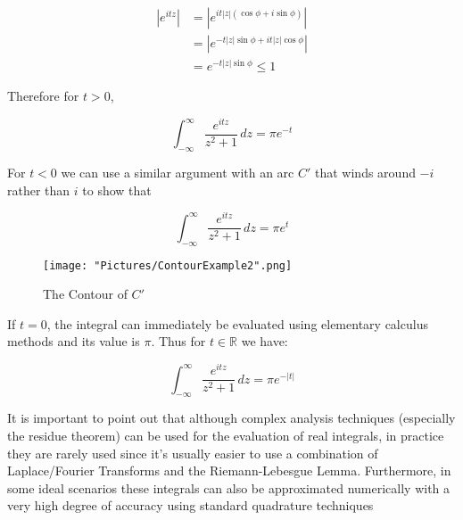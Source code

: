 \documentclass[12pt, letterpaper]{article}
\begin{document}
\begin{align*}
\left|e^{itz}\right| &=\left|e^{it|z|(\cos\phi + i\sin\phi)}\right| \\ &=\left|e^{-t|z|\sin\phi + it|z|\cos\phi}\right| \\
&=e^{-t|z|\sin\phi} \le 1 
\end{align*}

\noindent
Therefore for \(t > 0\),

\[ \int_{-\infty}^\infty \frac{e^{itz}}{z^2+1}\,dz=\pi e^{-t} \]
\bigskip

\noindent
For \(t < 0\) we can use a similar argument with an arc \(C'\) that winds around \(-i\) rather than \(i\) to show that 

\[ \int_{-\infty}^\infty\frac{e^{itz}}{z^2+1}\,dz=\pi e^t \]

\begin{figure}[h]
    \centering
    \texttt{[image: "Pictures/ContourExample2".png]}
    \caption{The Contour of \( C'\)}
    \label{fig:my_label6}
\end{figure}

\noindent
If \(t = 0 \), the integral can immediately be evaluated using elementary calculus methods and its value is \( \pi \). Thus for \(t \in \mathbb{R}\) we have:

\[ \int_{-\infty}^\infty\frac{e^{itz}}{z^2+1}\,dz=\pi e^{-\left|t\right|} \]
\bigskip

\noindent
It is important to point out that although complex analysis techniques (especially the residue theorem) can be used for the evaluation of real integrals, in practice they are rarely used since it's usually easier to use a combination of Laplace/Fourier Transforms and the Riemann-Lebesgue Lemma. Furthermore, in some ideal scenarios these integrals can also be approximated numerically with a very high degree of accuracy using standard quadrature techniques
\end{document}
